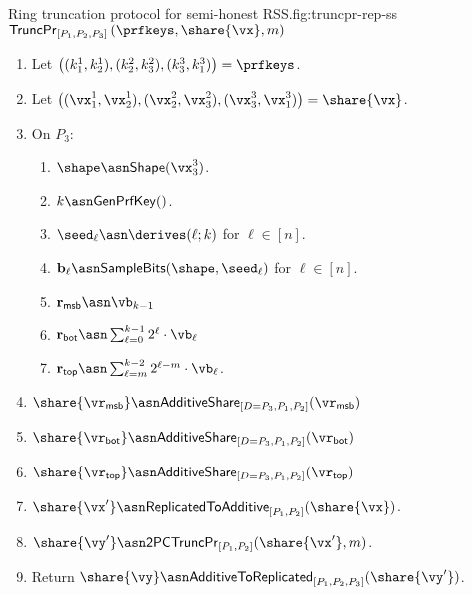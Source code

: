\begin{Boxfig}{Ring truncation protocol for semi-honest
RSS.}{fig:truncpr-rep-ss}{$\mathsf{TruncPr}_{[P_1, P_2, P_3]} \left(\prfkeys, \share{\vx}, m \right)$}
\begin{enumerate}
  \item Let $\left( (k_1^1, k_2^1), (k_2^2, k_3^2), (k_3^3, k_1^3) \right) = \prfkeys$.
  
  \item Let $\left( (\vx_1^1, \vx_2^1), (\vx_2^2, \vx_3^2), (\vx_3^3, \vx_1^3) \right) = \share{\vx}$.
  
  \item On $P_3$:
  \begin{enumerate}
    \item $\shape \asn \mathsf{Shape}(\vx^3_3)$.
    \item $k \asn \mathsf{GenPrfKey}()$.
    \item $\seed_\ell \asn \derives(\ell; k)$ for $\ell \in [n]$.
    \item $\mathbf{b}_\ell \asn \mathsf{SampleBits}(\shape, \seed_\ell)$ for $\ell \in [n]$.
    \item $\mathbf{r}_{\mathsf{msb}} \asn \vb_{k-1}$
    \item $\mathbf{r}_{\mathsf{bot}} \asn \sum_{\ell=0}^{k-1}2^\ell \cdot \vb_\ell$
    \item $\mathbf{r}_{\mathsf{top}} \asn \sum_{\ell=m}^{k-2} 2^{\ell-m} \cdot \vb_\ell$.
  \end{enumerate}

  \item $\share{\vr_{\mathsf{msb}}} \asn \mathsf{AdditiveShare}_{[D=P_3, P_1, P_2]}(\vr_{\mathsf{msb}})$

  \item $\share{\vr_{\mathsf{bot}}} \asn \mathsf{AdditiveShare}_{[D=P_3, P_1, P_2]}(\vr_{\mathsf{bot}})$
  
  \item $\share{\vr_{\mathsf{top}}} \asn \mathsf{AdditiveShare}_{[D=P_3, P_1, P_2]}(\vr_{\mathsf{top}})$
 
  \item $\share{\vx'} \asn \mathsf{ReplicatedToAdditive}_{[P_1, P_2]}(\share{\vx})$.

  \item $\share{\vy'} \asn \mathsf{2PCTruncPr}_{[P_1, P_2]}(\share{\vx'}, m)$.

  \item Return $\share{\vy} \asn \mathsf{AdditiveToReplicated}_{[P_1, P_2, P_3]}(\share{\vy'})$.


\end{enumerate}
\end{Boxfig}
